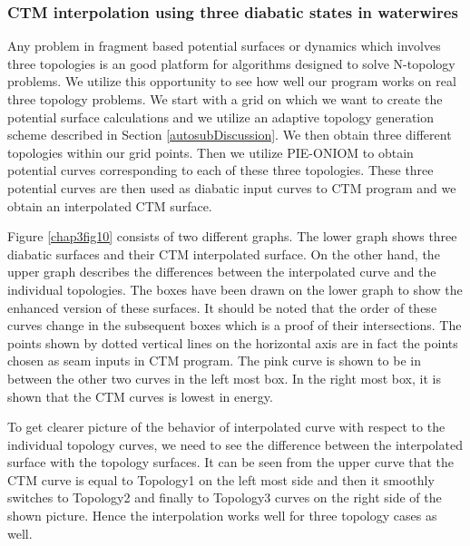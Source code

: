 \subsubsection{CTM interpolation using three diabatic states in waterwires}
Any problem in fragment based potential surfaces or dynamics which involves three topologies is an good platform
for algorithms designed to solve N-topology problems. We utilize this opportunity to see how well our program
works on real three topology problems. We start with a grid on which we want to create the potential surface
calculations and we utilize an adaptive topology generation scheme described in Section \ref{autosubDiscussion}.
We then obtain three different topologies within our grid points. Then we utilize PIE-ONIOM to obtain potential
curves corresponding to each of these three topologies. These three potential curves are then used as diabatic
input curves to CTM program and we obtain an interpolated CTM surface.

Figure \ref{chap3fig10} consists of two different graphs. The lower graph shows three diabatic surfaces and
their CTM interpolated surface. On the other hand, the upper graph describes the differences between the
interpolated curve and the individual topologies. The boxes have been drawn on the lower graph to show the
enhanced version of these surfaces. It should be noted that the order of these curves change in the subsequent
boxes which is a proof of their intersections. The points shown by dotted vertical lines on the horizontal axis
are in fact the points chosen as seam inputs in CTM program. The pink curve is shown to be in between
the other two curves in the left most box. In the right most box, it is shown that the CTM curves is lowest in
energy.

To get clearer picture of the behavior of interpolated curve with respect to the individual topology curves,
we need to see the difference between the interpolated surface with the topology surfaces. It can be seen from
the upper curve that the CTM curve is equal to Topology1 on the left most side and then it smoothly switches to
Topology2 and finally to Topology3 curves on the right side of the shown picture. Hence the interpolation works
well for three topology cases as well.

